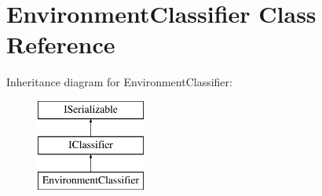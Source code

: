 \hypertarget{class_environment_classifier}{}\section{Environment\+Classifier Class Reference}
\label{class_environment_classifier}
Inheritance diagram for Environment\+Classifier\+:\begin{figure}[H]
\begin{center}
\leavevmode
\includegraphics[height=3.000000cm]{class_environment_classifier}
\end{center}
\end{figure}
